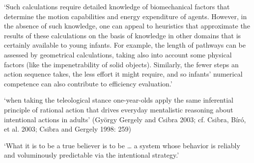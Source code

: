 \documentclass[12pt]{extarticle}
\begin{document}
\begin{multicols}{3}
`Such calculations require detailed knowledge of biomechanical factors that determine the motion capabilities and energy expenditure of agents. However, in the absence of such knowledge, one can appeal to heuristics that approximate the results of these calculations on the basis of knowledge in other domains that is certainly available to young infants. For example, the length of pathways can be assessed by geometrical calculations, taking also into account some physical factors (like the impenetrability of solid objects). Similarly, the fewer steps an action sequence takes, the less effort it might require, and so infants’ numerical competence can also contribute to efficiency evaluation.’
 
‘when taking the teleological stance one-year-olds apply the same inferential principle of rational action that drives everyday mentalistic reasoning about intentional actions in adults’
(György Gergely and Csibra 2003; cf. Csibra, Bíró, et al. 2003; Csibra and Gergely 1998: 259)
 
‘What it is to be a true believer is to be … a system whose behavior is reliably and voluminously predictable via the intentional strategy.’
\citep[p.\ 15]{Dennett:1987sf}
 
 
 
 
 
 
\footnotesize 


\end{multicols}
\end{document}
